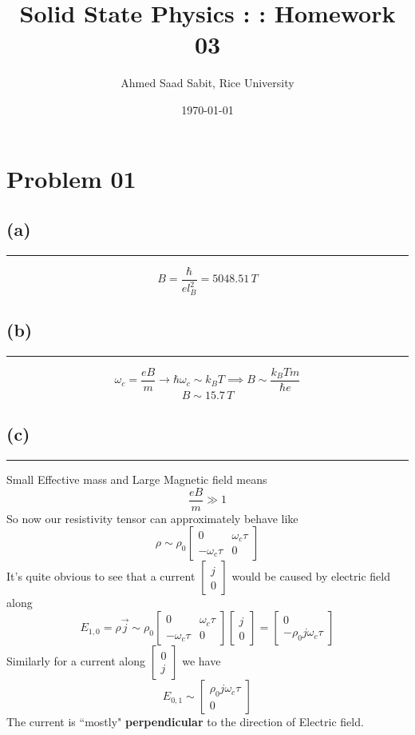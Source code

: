 \documentclass[letter, 10pts]{article}
\title{Solid State Physics : : Homework 03}
\author{Ahmed Saad Sabit, Rice University}
\date{\today}
\newcommand{\hb}{\hbar}
\begin{document}
\maketitle

\section*{Problem 01} 
\subsection*{(a)} 
\hrule
\[
	B = \frac{\hb }{e l_B^2} = 5048.51 \, T 
\] 

\subsection*{(b)} 
\hrule 
\[
\omega_c = \frac{eB}{m} \to \hb \omega_c \sim k_B T \implies B  \sim \frac{k_B T m}{\hb e} 
\]
\[
B \sim 15.7 \, T
\] 

\subsection*{(c)} 
\hrule
Small Effective mass and Large Magnetic field means 
\[
\frac{eB}{m} \gg 1 
\]
So now our resistivity tensor can approximately behave like 
\[
	\rho \sim \rho_0 \begin{bmatrix} 0 & \omega_c \tau \\ - \omega_c \tau & 0 \end{bmatrix} 
\]
It's quite obvious to see that a current $\begin{bmatrix} j \\ 0 \end{bmatrix} $ would be caused by electric field along 
\[
	E_{1,0}   = \rho  \vec{j}  \sim \rho_0 \begin{bmatrix} 0 & \omega_c \tau \\ - \omega_c \tau & 0 \end{bmatrix}  \begin{bmatrix} j \\ 0 \end{bmatrix}  =  \begin{bmatrix} 0 \\ - \rho_0 j \omega_c \tau \end{bmatrix} 
\] 
Similarly for a current along $\begin{bmatrix} 0 \\ j \end{bmatrix} $ we have 
\[
	E_{0,1} \sim \begin{bmatrix} \rho_0 j \omega_c \tau \\ 0  \end{bmatrix} 
\]
The current is ``mostly" \textbf{perpendicular} to the direction of Electric field.
\end{document}
